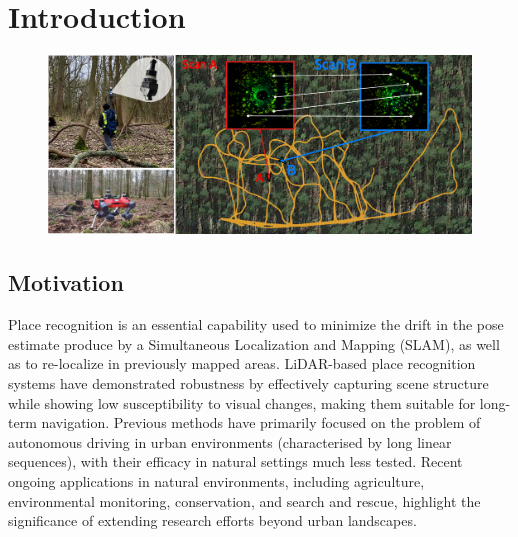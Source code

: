 \chapter{Introduction}
\label{chap:intro}

\begin{figure}
    \includegraphics[width=\linewidth]{pics/header.png}
    \label{fig:motivation}
\end{figure}

\section{Motivation}
Place recognition is an essential capability used to minimize the drift in the pose estimate produce by a Simultaneous Localization and Mapping (SLAM), as well as to re-localize in previously mapped areas. 
LiDAR-based place recognition systems have demonstrated robustness by effectively capturing scene structure while showing low susceptibility to visual changes, making them suitable for long-term navigation. 
Previous methods have primarily focused on the problem of autonomous driving in urban environments (characterised by long linear sequences), with their efficacy in natural settings much less tested.
Recent ongoing applications in natural environments, including agriculture, environmental monitoring, conservation, and search and rescue, highlight the significance of extending research efforts beyond urban landscapes.


